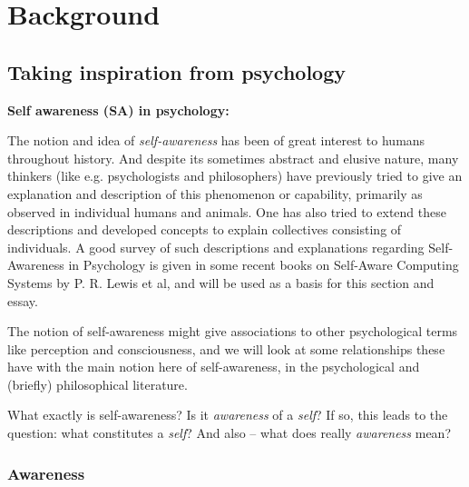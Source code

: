 \chapter{Background}
\label{chap:background}



	
	

\section{Taking inspiration from psychology}

\textbf{Self awareness (SA) in psychology:} \nl	

The notion and idea of \textit{self-awareness} has been of great interest to humans throughout history. And despite its sometimes abstract and elusive nature, many thinkers (like e.g. psychologists and philosophers) have previously tried to give an explanation and description of this phenomenon or capability, primarily as observed in individual humans and animals. One has also tried to extend these descriptions and developed concepts to explain collectives consisting of individuals. A good survey of such descriptions and explanations regarding Self-Awareness in Psychology is given in some recent books on Self-Aware Computing Systems \cite{sacs16_ch2, sacs17_ch3} by P. R. Lewis et al, and will be used as a basis for this section and essay.

The notion of self-awareness might give associations to other psychological terms like perception and consciousness, and we will look at some relationships these have with the main notion here of self-awareness, in the psychological and (briefly) philosophical literature.
\newline

What exactly is self-awareness? Is it \textit{awareness} of a \textit{self}? If so, this leads to the question: what constitutes a \textit{self}? And also -- what does really \textit{awareness} mean?
\newline

	\subsection{Awareness}

